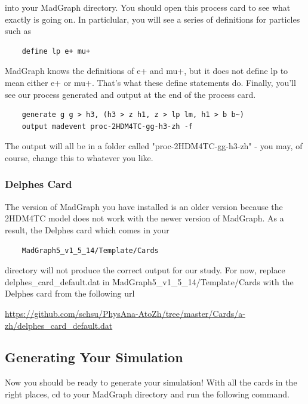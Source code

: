 \documentclass{article}
\begin{document}
\bigskip

into your MadGraph directory. You should open this process card to see what exactly is going on. In particlular, you will see a series of definitions for particles such as

\begin{verbatim}
	define lp e+ mu+
\end{verbatim}

MadGraph knows the definitions of e+ and mu+, but it does not define lp to mean either e+ or mu+. That's what these define statements do. Finally, you'll see our process generated and output at the end of the process card.

\begin{verbatim}
	generate g g > h3, (h3 > z h1, z > lp lm, h1 > b b~)
	output madevent proc-2HDM4TC-gg-h3-zh -f
\end{verbatim}

The output will all be in a folder called "proc-2HDM4TC-gg-h3-zh" - you may, of course, change this to whatever you like.

\subsubsection*{Delphes Card}

The version of MadGraph you have installed is an older version because the 2HDM4TC model does not work with the newer version of MadGraph. As a result, the Delphes card which comes in your 

\begin{verbatim}
	MadGraph5_v1_5_14/Template/Cards
\end{verbatim}

directory will not produce the correct output for our study. For now, replace delphes\_card\_default.dat in MadGraph5\_v1\_5\_14/Template/Cards with the Delphes card from the following url

\bigskip

\url{https://github.com/schsu/PhysAna-AtoZh/tree/master/Cards/a-zh/delphes_card_default.dat}

\bigskip

\subsection{Generating Your Simulation}

Now you should be ready to generate your simulation! With all the cards in the right places, cd to your MadGraph directory and run the following command.
\end{document}

